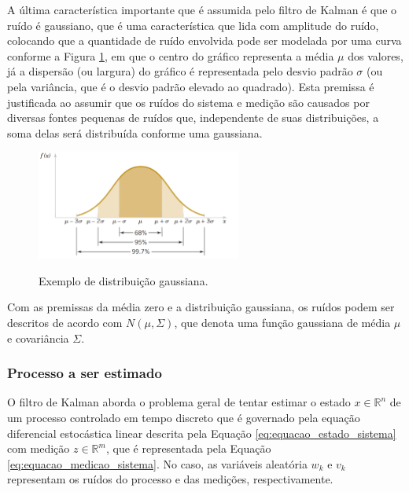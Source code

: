 \documentclass[acronym, symbols, table, deposito]{fei}
\begin{document}
				A última característica importante que é assumida pelo filtro de Kalman é que o ruído é gaussiano, que é uma característica que lida com amplitude do ruído, colocando que a quantidade de ruído envolvida pode ser modelada por uma curva conforme a Figura \ref{fig:distribuicao_gaussiana}, em que o centro do gráfico representa a média $\mu$ dos valores, já a dispersão (ou largura) do gráfico é representada pelo desvio padrão $\sigma$ (ou pela variância, que é o desvio padrão elevado ao quadrado). Esta premissa é justificada ao assumir que os ruídos do sistema e medição são causados por diversas fontes pequenas de ruídos que, independente de suas distribuições, a soma delas será distribuída conforme uma gaussiana.
				
				\begin{figure}[!htb]
					\centering
					\caption{Exemplo de distribuição gaussiana.} 
					\includegraphics[width=0.6\textwidth]{distribuicao_gaussiana.png}
					\label{fig:distribuicao_gaussiana}
				\end{figure}
			
				Com as premissas da média zero e a distribuição gaussiana, os ruídos podem ser descritos de acordo com $N(\mu,\Sigma)$, que denota uma função gaussiana de média $\mu$ e covariância $\Sigma$.
		
		\subsubsection{Processo a ser estimado}
		
			O filtro de Kalman aborda o problema geral de tentar estimar o estado $x \in \mathbb{R}^n$ de um processo controlado em tempo discreto que é governado pela equação diferencial estocástica linear descrita pela Equação \eqref{eq:equacao_estado_sistema} com medição $z \in \mathbb{R}^m$, que é representada pela Equação \eqref{eq:equacao_medicao_sistema}. No caso, as variáveis aleatória $w_k$ e $v_k$ representam os ruídos do processo e das medições, respectivamente.
			
\end{document}
